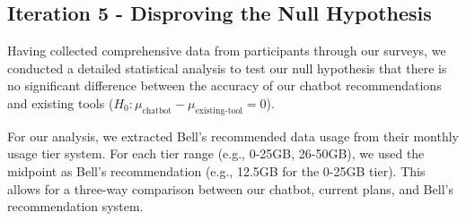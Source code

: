 \documentclass[conference]{IEEEtran}
\begin{document}
\subsection{Iteration 5 - Disproving the Null Hypothesis}

Having collected comprehensive data from participants through our surveys, we conducted a detailed statistical analysis to test our null hypothesis that there is no significant difference between the accuracy of our chatbot recommendations and existing tools ($H_0: \mu_{\text{chatbot}} - \mu_{\text{existing-tool}} = 0$).

\begin{table}[ht!]
\centering
\scriptsize
\caption{Comparison of Recommendation Methods and Error Analysis}
\label{tab:ThreeWayComparison}
\end{table}

For our analysis, we extracted Bell's recommended data usage from their monthly usage tier system. For each tier range (e.g., 0-25GB, 26-50GB), we used the midpoint as Bell's recommendation (e.g., 12.5GB for the 0-25GB tier). This allows for a three-way comparison between our chatbot, current plans, and Bell's recommendation system.
\end{document}
